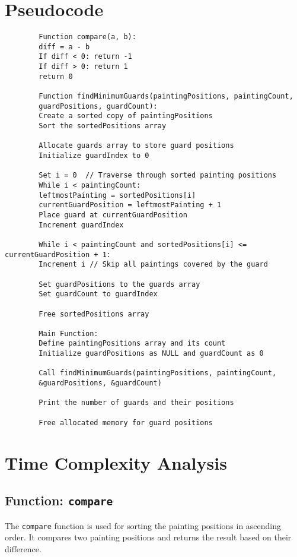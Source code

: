 \documentclass[a4paper,12pt]{report}
\begin{document}
\section*{Pseudocode}

\begin{tcolorbox}[colback=white, colframe=black, boxrule=0.5pt]
	\ttfamily\small
	\begin{verbatim}
		Function compare(a, b):
		diff = a - b
		If diff < 0: return -1
		If diff > 0: return 1
		return 0
		
		Function findMinimumGuards(paintingPositions, paintingCount,
		guardPositions, guardCount):
		Create a sorted copy of paintingPositions
		Sort the sortedPositions array
		
		Allocate guards array to store guard positions
		Initialize guardIndex to 0
		
		Set i = 0  // Traverse through sorted painting positions
		While i < paintingCount:
		leftmostPainting = sortedPositions[i]
		currentGuardPosition = leftmostPainting + 1
		Place guard at currentGuardPosition
		Increment guardIndex
		
		While i < paintingCount and sortedPositions[i] <= currentGuardPosition + 1:
		Increment i // Skip all paintings covered by the guard
		
		Set guardPositions to the guards array
		Set guardCount to guardIndex
		
		Free sortedPositions array
		
		Main Function:
		Define paintingPositions array and its count
		Initialize guardPositions as NULL and guardCount as 0
		
		Call findMinimumGuards(paintingPositions, paintingCount,
		&guardPositions, &guardCount)
		
		Print the number of guards and their positions
		
		Free allocated memory for guard positions
	\end{verbatim}
\end{tcolorbox}

\section*{Time Complexity Analysis}

\subsection*{Function: \texttt{compare}}

The \texttt{compare} function is used for sorting the painting positions in ascending order. It compares two painting positions and returns the result based on their difference.
\end{document}
